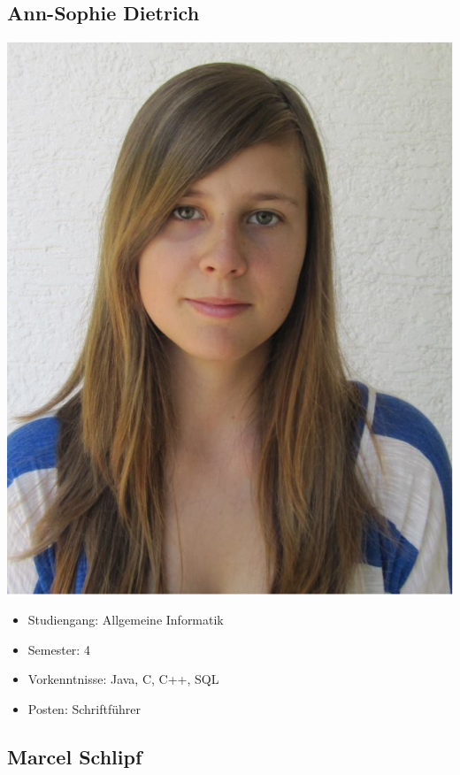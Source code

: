 \subsection{Ann-Sophie Dietrich}
\begin{minipage}{0.28\textwidth} 
\includegraphics[width=\textwidth]{content/pictures/Gruppenbilder/Sophie.jpg}
\end{minipage}%
\begin{minipage}{0.7\textwidth}
\begin{itemize}
 \item Studiengang: Allgemeine Informatik
  \item Semester: 4
  \item Vorkenntnisse: Java, C, C++, SQL
  \item Posten: Schriftführer
\end{itemize}
\end{minipage}

\subsection{Marcel Schlipf}

